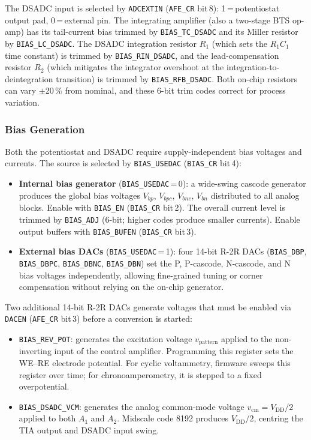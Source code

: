 The DSADC input is selected by \texttt{ADCEXTIN} (\texttt{AFE\_CR} bit\,8): 1\,=\,potentiostat output pad, 0\,=\,external pin. The integrating amplifier (also a two-stage BTS op-amp) has its tail-current bias trimmed by \texttt{BIAS\_TC\_DSADC} and its Miller resistor by \texttt{BIAS\_LC\_DSADC}. The DSADC integration resistor $R_1$ (which sets the $R_1C_1$ time constant) is trimmed by \texttt{BIAS\_RIN\_DSADC}, and the lead-compensation resistor $R_2$ (which mitigates the integrator overshoot at the integration-to-deintegration transition) is trimmed by \texttt{BIAS\_RFB\_DSADC}. Both on-chip resistors can vary $\pm$20\,\% from nominal, and these 6-bit trim codes correct for process variation.

\subsubsection*{Bias Generation}

Both the potentiostat and DSADC require supply-independent bias voltages and currents. The source is selected by \texttt{BIAS\_USEDAC} (\texttt{BIAS\_CR} bit\,4):

\begin{itemize}
    \item \textbf{Internal bias generator} (\texttt{BIAS\_USEDAC}\,=\,0): a wide-swing cascode generator produces the global bias voltages $V_{bp}$, $V_{bpc}$, $V_{bnc}$, $V_{bn}$ distributed to all analog blocks. Enable with \texttt{BIAS\_EN} (\texttt{BIAS\_CR} bit\,2). The overall current level is trimmed by \texttt{BIAS\_ADJ} (6-bit; higher codes produce smaller currents). Enable output buffers with \texttt{BIAS\_BUFEN} (\texttt{BIAS\_CR} bit\,3).
    \item \textbf{External bias DACs} (\texttt{BIAS\_USEDAC}\,=\,1): four 14-bit R-2R DACs (\texttt{BIAS\_DBP}, \texttt{BIAS\_DBPC}, \texttt{BIAS\_DBNC}, \texttt{BIAS\_DBN}) set the P, P-cascode, N-cascode, and N bias voltages independently, allowing fine-grained tuning or corner compensation without relying on the on-chip generator.
\end{itemize}

Two additional 14-bit R-2R DACs generate voltages that must be enabled via \texttt{DACEN} (\texttt{AFE\_CR} bit\,3) before a conversion is started:
\begin{itemize}
    \item \texttt{BIAS\_REV\_POT}: generates the excitation voltage $v_\mathrm{pattern}$ applied to the non-inverting input of the control amplifier. Programming this register sets the WE--RE electrode potential. For cyclic voltammetry, firmware sweeps this register over time; for chronoamperometry, it is stepped to a fixed overpotential.
    \item \texttt{BIAS\_DSADC\_VCM}: generates the analog common-mode voltage $v_\mathrm{cm} = V_\mathrm{DD}/2$ applied to both $A_1$ and $A_2$. Midscale code 8192 produces $V_\mathrm{DD}/2$, centring the TIA output and DSADC input swing.
\end{itemize}

